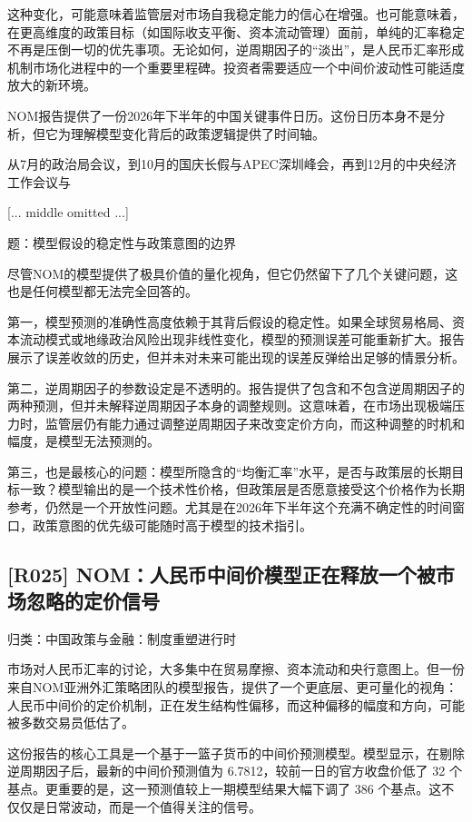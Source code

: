 \documentclass[11pt]{ctexart}
\begin{document}
这种变化，可能意味着监管层对市场自我稳定能力的信心在增强。也可能意味着，在更高维度的政策目标（如国际收支平衡、资本流动管理）面前，单纯的汇率稳定不再是压倒一切的优先事项。无论如何，逆周期因子的“淡出”，是人民币汇率形成机制市场化进程中的一个重要里程碑。投资者需要适应一个中间价波动性可能适度放大的新环境。

NOM报告提供了一份2026年下半年的中国关键事件日历。这份日历本身不是分析，但它为理解模型变化背后的政策逻辑提供了时间轴。

从7月的政治局会议，到10月的国庆长假与APEC深圳峰会，再到12月的中央经济工作会议与

[... middle omitted ...]

题：模型假设的稳定性与政策意图的边界

尽管NOM的模型提供了极具价值的量化视角，但它仍然留下了几个关键问题，这也是任何模型都无法完全回答的。

第一，模型预测的准确性高度依赖于其背后假设的稳定性。如果全球贸易格局、资本流动模式或地缘政治风险出现非线性变化，模型的预测误差可能重新扩大。报告展示了误差收敛的历史，但并未对未来可能出现的误差反弹给出足够的情景分析。

第二，逆周期因子的参数设定是不透明的。报告提供了包含和不包含逆周期因子的两种预测，但并未解释逆周期因子本身的调整规则。这意味着，在市场出现极端压力时，监管层仍有能力通过调整逆周期因子来改变定价方向，而这种调整的时机和幅度，是模型无法预测的。

第三，也是最核心的问题：模型所隐含的“均衡汇率”水平，是否与政策层的长期目标一致？模型输出的是一个技术性价格，但政策层是否愿意接受这个价格作为长期参考，仍然是一个开放性问题。尤其是在2026年下半年这个充满不确定性的时间窗口，政策意图的优先级可能随时高于模型的技术指引。

\subsection{[R025] NOM：人民币中间价模型正在释放一个被市场忽略的定价信号}
{\small\color{refgray}归类：中国政策与金融：制度重塑进行时}

市场对人民币汇率的讨论，大多集中在贸易摩擦、资本流动和央行意图上。但一份来自NOM亚洲外汇策略团队的模型报告，提供了一个更底层、更可量化的视角：人民币中间价的定价机制，正在发生结构性偏移，而这种偏移的幅度和方向，可能被多数交易员低估了。

这份报告的核心工具是一个基于一篮子货币的中间价预测模型。模型显示，在剔除逆周期因子后，最新的中间价预测值为 6.7812，较前一日的官方收盘价低了 32 个基点。更重要的是，这一预测值较上一期模型结果大幅下调了 386 个基点。这不仅仅是日常波动，而是一个值得关注的信号。
\end{document}
